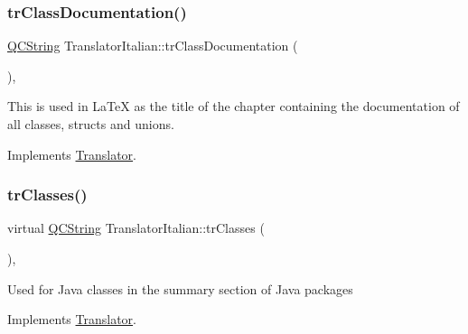 \mbox{\label{class_translator_italian_a16c3f6b4b73775d83e0c91d2b43bdc8a}} 
\subsubsection{\texorpdfstring{trClassDocumentation()}{trClassDocumentation()}}
{\footnotesize\ttfamily \mbox{\hyperlink{class_q_c_string}{Q\+C\+String}} Translator\+Italian\+::tr\+Class\+Documentation (\begin{DoxyParamCaption}{ }\end{DoxyParamCaption})\hspace{0.3cm}{\ttfamily [inline]}, {\ttfamily [virtual]}}

This is used in La\+TeX as the title of the chapter containing the documentation of all classes, structs and unions. 

Implements \mbox{\hyperlink{class_translator}{Translator}}.

\mbox{\label{class_translator_italian_ac669dab3bfdde9cf9c0a662917d3e46b}} 
\subsubsection{\texorpdfstring{trClasses()}{trClasses()}}
{\footnotesize\ttfamily virtual \mbox{\hyperlink{class_q_c_string}{Q\+C\+String}} Translator\+Italian\+::tr\+Classes (\begin{DoxyParamCaption}{ }\end{DoxyParamCaption})\hspace{0.3cm}{\ttfamily [inline]}, {\ttfamily [virtual]}}

Used for Java classes in the summary section of Java packages 

Implements \mbox{\hyperlink{class_translator}{Translator}}.

\mbox{\label{class_translator_italian_ae2cf28022bedf22c63e046c3b87689e5}} 
